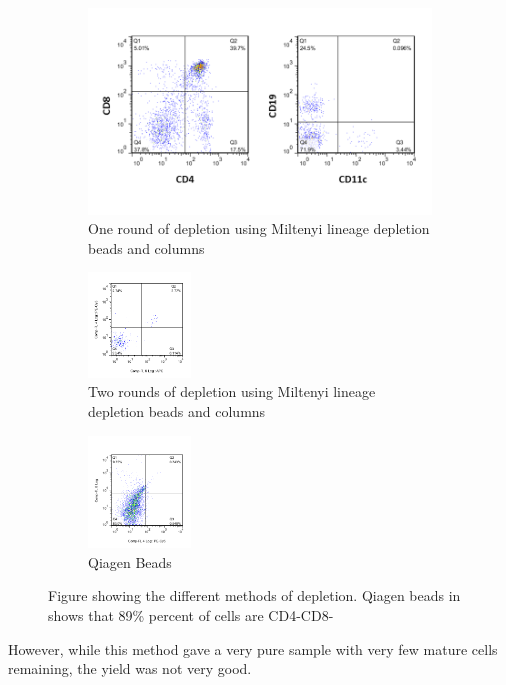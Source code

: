 \begin{figure}
	\begin{subfigure}{\textwidth}
	\includegraphics[width=\textwidth]{Figures/1rounddepletion.png}
	\caption{One round of depletion using Miltenyi lineage depletion beads and columns}
	\end{subfigure}
	\hfill
	\begin{subfigure}{\textwidth}
	\includegraphics[width=0.3\textwidth]{Figures/2rounddepletion.png}
	\caption{Two rounds of depletion using Miltenyi lineage depletion beads and columns}
	\label{subfig:2miltenyi}
	\end{subfigure}
	\hfill
	\begin{subfigure}{\textwidth}
	\includegraphics[width=0.3\textwidth] {Figures/Qiagenbeads.png}
	\caption{Qiagen Beads}
	\label{subfig:Qiagen}
	\end{subfigure}
	
\caption{Figure showing the different methods of depletion. Qiagen beads in shows that 89\% percent of cells are CD4-CD8-}
\end{figure}
However, while this method gave a very pure sample with very few mature cells remaining, the yield was not very good.

